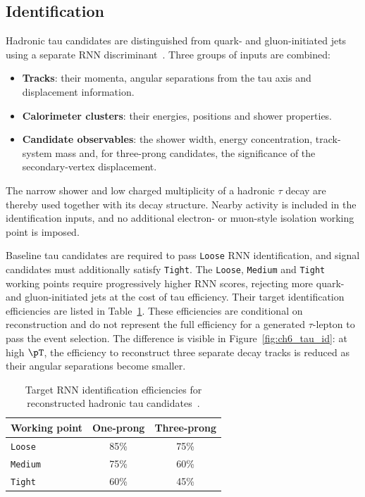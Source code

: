 \subsection{Identification}

Hadronic tau candidates are distinguished from quark- and gluon-initiated jets using a separate RNN discriminant~\cite{ATLAS2019TauRNN,ATLAS2022TauR22}.
Three groups of inputs are combined:
\begin{itemize}
    \item \textbf{Tracks}: their momenta, angular separations from the tau axis and displacement information.
    \item \textbf{Calorimeter clusters}: their energies, positions and shower properties.
    \item \textbf{Candidate observables}: the shower width, energy concentration, track-system mass and, for three-prong candidates, the significance of the secondary-vertex displacement.
\end{itemize}
The narrow shower and low charged multiplicity of a hadronic $\tau$ decay are thereby used together with its decay structure.
Nearby activity is included in the identification inputs, and no additional electron- or muon-style isolation working point is imposed.

Baseline tau candidates are required to pass \texttt{Loose} RNN identification, and signal candidates must additionally satisfy \texttt{Tight}.
The \texttt{Loose}, \texttt{Medium} and \texttt{Tight} working points require progressively higher RNN scores, rejecting more quark- and gluon-initiated jets at the cost of tau efficiency.
Their target identification efficiencies are listed in Table~\ref{tab:ch6_tau_id}.
These efficiencies are conditional on reconstruction and do not represent the full efficiency for a generated $\tau$-lepton to pass the event selection.
The difference is visible in Figure~\ref{fig:ch6_tau_id}: at high $\pT$, the efficiency to reconstruct three separate decay tracks is reduced as their angular separations become smaller.

\begin{table}[htbp]
    \centering
    \caption[Target efficiencies of the hadronic tau identification working points]{Target RNN identification efficiencies for reconstructed hadronic tau candidates~\cite{ATLAS2022TauR22}.}
    \label{tab:ch6_tau_id}
    \begin{tabular}{lcc}
        \toprule
        Working point & One-prong & Three-prong \\
        \midrule
        \texttt{Loose} & 85\% & 75\% \\
        \texttt{Medium} & 75\% & 60\% \\
        \texttt{Tight} & 60\% & 45\% \\
        \bottomrule
    \end{tabular}
\end{table}

